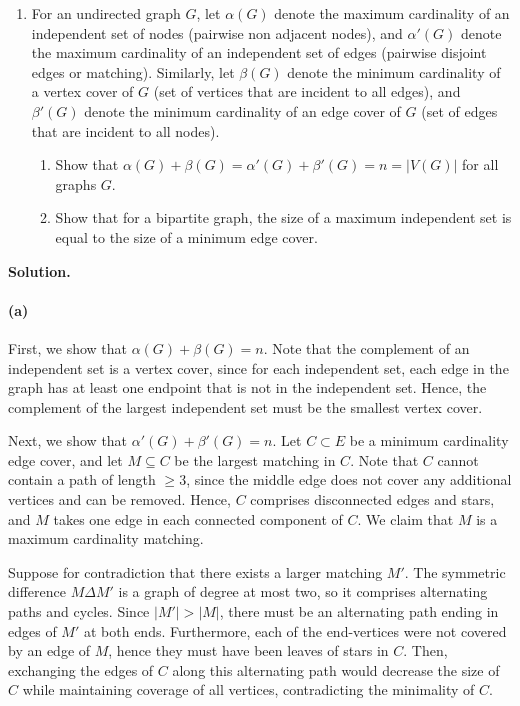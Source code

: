 \documentclass[11pt,letterpaper]{article}
\theoremstyle{definition}
\newcommand{\solution}{\medskip\noindent\textbf{Solution.}\par\medskip}
\begin{document}
\begin{enumerate}[resume]
\item For an undirected graph $G$, let $\alpha(G)$ denote the maximum cardinality of an independent set of nodes (pairwise non adjacent nodes), and $\alpha'(G)$ denote the maximum cardinality of an independent set of edges (pairwise disjoint edges or matching). Similarly, let $\beta(G)$ denote the minimum cardinality of a vertex cover of $G$ (set of vertices that are incident to all edges), and $\beta'(G)$ denote the minimum cardinality of an edge cover of $G$ (set of edges that are incident to all nodes).
\begin{enumerate}
\item Show that $\alpha(G) + \beta(G) = \alpha'(G) + \beta'(G) = n = |V(G)|$ for all graphs $G$.
\item Show that for a bipartite graph, the size of a maximum independent set is equal to the size of a minimum edge cover.
\end{enumerate}
\end{enumerate}

\solution
\paragraph{(a)}
First, we show that $\alpha(G) + \beta(G) = n$. 
Note that the complement of an independent set is a vertex cover, since for each independent set, each edge in the graph has at least one endpoint that is not in the independent set.
Hence, the complement of the largest independent set must be the smallest vertex cover.

Next, we show that $\alpha'(G) + \beta'(G) = n$. 
Let $C\subset E$ be a minimum cardinality edge cover, and let $M\subseteq C$ be the largest matching in $C$. 
Note that $C$ cannot contain a path of length $\geq 3$, since the middle edge does not cover any additional vertices and can be removed. 
Hence, $C$ comprises disconnected edges and stars, and $M$ takes one edge in each connected component of $C$.
We claim that $M$ is a maximum cardinality matching. 

Suppose for contradiction that there exists a larger matching $M'$.
The symmetric difference $M\Delta M'$ is a graph of degree at most two, so it comprises alternating paths and cycles.
Since $|M'|>|M|$, there must be an alternating path ending in edges of $M'$ at both ends. 
Furthermore, each of the end-vertices were not covered by an edge of $M$, hence they must have been leaves of stars in $C$.
Then, exchanging the edges of $C$ along this alternating path would decrease the size of $C$ while maintaining coverage of all vertices, contradicting the minimality of $C$. 
\end{document}
